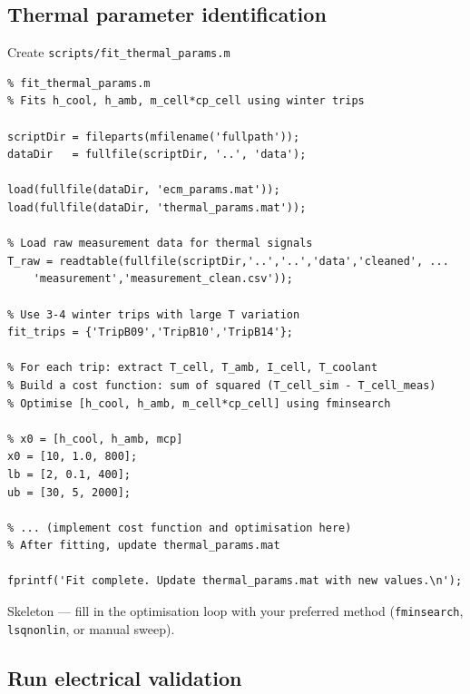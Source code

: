 \documentclass[11pt,a4paper]{article}
\begin{document}
\subsection{Thermal parameter identification}

\begin{scriptbox}{Create \texttt{scripts/fit\_thermal\_params.m}}
\begin{verbatim}
% fit_thermal_params.m
% Fits h_cool, h_amb, m_cell*cp_cell using winter trips

scriptDir = fileparts(mfilename('fullpath'));
dataDir   = fullfile(scriptDir, '..', 'data');

load(fullfile(dataDir, 'ecm_params.mat'));
load(fullfile(dataDir, 'thermal_params.mat'));

% Load raw measurement data for thermal signals
T_raw = readtable(fullfile(scriptDir,'..','..','data','cleaned', ...
    'measurement','measurement_clean.csv'));

% Use 3-4 winter trips with large T variation
fit_trips = {'TripB09','TripB10','TripB14'};

% For each trip: extract T_cell, T_amb, I_cell, T_coolant
% Build a cost function: sum of squared (T_cell_sim - T_cell_meas)
% Optimise [h_cool, h_amb, m_cell*cp_cell] using fminsearch

% x0 = [h_cool, h_amb, mcp]
x0 = [10, 1.0, 800];
lb = [2, 0.1, 400];
ub = [30, 5, 2000];

% ... (implement cost function and optimisation here)
% After fitting, update thermal_params.mat

fprintf('Fit complete. Update thermal_params.mat with new values.\n');
\end{verbatim}
Skeleton — fill in the optimisation loop with your preferred method (\texttt{fminsearch}, \texttt{lsqnonlin}, or manual sweep).
\end{scriptbox}

\subsection{Run electrical validation}
\end{document}

